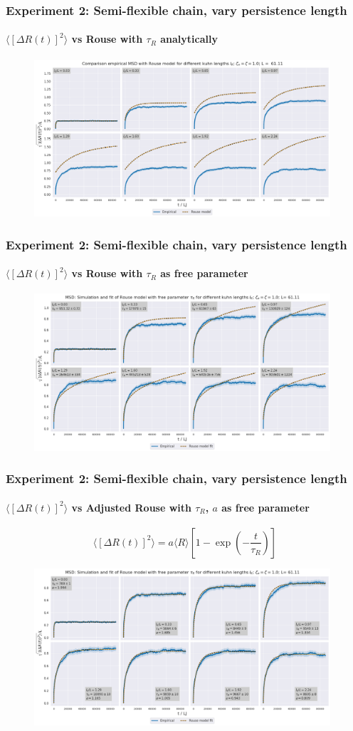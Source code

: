 \documentclass[handout]{beamer}
\newcommand{\mean}[1]{\langle #1 \rangle}
\begin{document}
\begin{frame}
    \frametitle{Experiment 2: Semi-flexible chain, vary persistence length}
    \framesubtitle{$\mean{[\Delta R(t)]^2}$ vs Rouse with $\tau_R$ analytically}

    \begin{figure}[h]
        \includegraphics[width=11cm]{./4-exp-delta_R-rouse_anal.png}
    \end{figure}
\end{frame}


\begin{frame}
    \frametitle{Experiment 2: Semi-flexible chain, vary persistence length}
    \framesubtitle{$\mean{[\Delta R(t)]^2}$ vs Rouse with $\tau_R$ as free parameter}

    \begin{figure}[h]
        \includegraphics[width=11cm]{./4-exp-delta_R-rouse_fit-tau.png}
    \end{figure}
\end{frame}

\begin{frame}
    \frametitle{Experiment 2: Semi-flexible chain, vary persistence length}
    \framesubtitle{$\mean{[\Delta R(t)]^2}$ vs Adjusted Rouse with $\tau_R$, $a$ as free parameter}
    $$ \mean{[\Delta R(t)]^2} = a \mean{R} [1 - \exp(-\frac{t}{\tau_R})] $$
    \begin{figure}[h]
        \includegraphics[width=11cm]{./4-exp-delta_R-rouse_fit-tau-a.png}
    \end{figure}
\end{frame}
\end{document}
